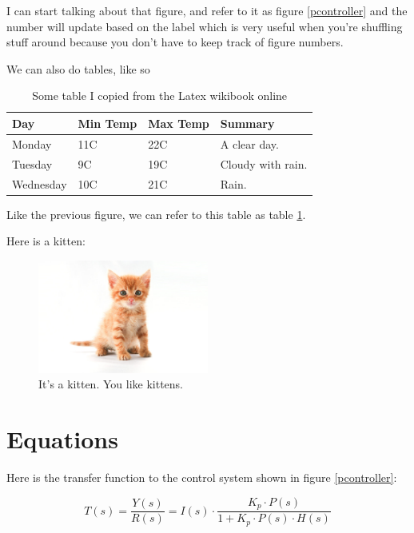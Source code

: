 \documentclass[12pt]{article}
\begin{document}
	I can start talking about that figure, and refer to it as figure \ref{pcontroller} and the number will update based on the label which is very useful when you're shuffling stuff around because you don't have to keep track of figure numbers.

	We can also do tables, like so

	\begin{center}
		\begin{table}[!ht]
			\caption{Some table I copied from the Latex wikibook online}
			\begin{tabular}{ | l | l | l | p{5cm} |}
			\hline
			Day & Min Temp & Max Temp & Summary \\ \hline
			Monday & 11C & 22C & A clear day. \\ 	\hline
			Tuesday & 9C & 19C & Cloudy with rain.\\ \hline
			Wednesday & 10C & 21C & Rain. \\
			\hline
			\end{tabular}
			\label{shittytable}
		\end{table}
	\end{center}

	Like the previous figure, we can refer to this table as table \ref{shittytable}.

	Here is a kitten:

	\begin{figure}[!ht]
	\label{kitten}
	\centering
	\includegraphics[width=0.5\textwidth]{kitten}
	\caption{It's a kitten. You like kittens.}
	\end{figure}

	\section{Equations}

	Here is the transfer function to the control system shown in figure \ref{pcontroller}:

	\begin{equation}
	\label{ptransfer}
	T(s)=\frac{Y(s)}{R(s)}=I(s) \cdot \frac{K_p \cdot P(s)}{1 + K_p \cdot P(s) \cdot H(s)}
	\end{equation}
\end{document}
